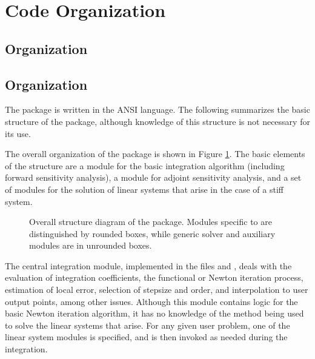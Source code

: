 \section{Code Organization}\label{s:organization}

\subsection{{\sundials} Organization}\label{ss:sun_org}


\subsection{{\cvodes} Organization}\label{ss:cvodes_org}

The {\cvodes} package is written in the ANSI {\C} language. The following
summarizes the basic structure of the package, although knowledge
of this structure is not necessary for its use.

The overall organization of the {\cvodes} package is shown in Figure
\ref{f:cvsorg}.  The basic elements of the structure are a module for
the basic integration algorithm (including forward sensitivity analysis),
a module for adjoint sensitivity analysis, and a set of modules for the solution
of linear systems that arise in the case of a stiff system.  
\begin{figure}
\centerline{}
\caption [Overall structure diagram of the {\cvodes} package]
{Overall structure diagram of the {\cvodes} package.
  Modules specific to {\cvodes} are distinguished by rounded boxes, while 
  generic solver and auxiliary modules are in unrounded boxes.}
\label{f:cvsorg}
\end{figure}

The central integration module, implemented in the files 
 and , deals with the evaluation of integration coefficients,
the functional or Newton iteration process, estimation of local error,
selection of stepsize and order, and interpolation to user output
points, among other issues.  Although this module contains logic for
the basic Newton iteration algorithm, it has no knowledge of the
method being used to solve the linear systems that arise.  For any
given user problem, one of the linear system modules is specified, and
is then invoked as needed during the integration. 

